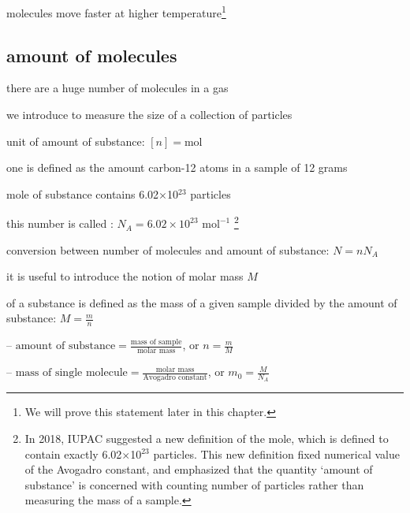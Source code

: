 molecules move faster at higher temperature\footnote{We will prove this statement later in this chapter.}


\subsection{amount of molecules}

there are a huge number of molecules in a gas

we introduce  to measure the size of a collection of particles

\cmt unit of amount of substance: $[n] = \text{mol}$

\begin{ilight}
	one  is defined as the amount carbon-12 atoms in a sample of 12 grams
\end{ilight}

 mole of substance contains 6.02$\times$10$^{23}$ particles

this number is called : $N_A = 6.02\times10^{23} \text{ mol}^{-1}$ \footnote{In 2018, IUPAC suggested a new definition of the mole, which is defined to contain exactly 6.02$\times$10$^{23}$ particles. This new definition fixed numerical value of the Avogadro constant, and emphasized that the quantity `amount of substance' is concerned with counting number of particles rather than measuring the mass of a sample.}

conversion between number of molecules and amount of substance: $\boxed{N=nN_A}$

\cmt it is useful to introduce the notion of molar mass $M$

\begin{ilight}
	 of a substance is defined as the mass of a given sample divided by the amount of substance: $M=\frac{m}{n}$
\end{ilight}

\begin{compactitem}
	\item[--] $\text{amount of substance} = \frac{\text{mass of sample}}{\text{molar mass}}$, or $n = \frac{m}{M}$
	
	\eqyskip
	
	\item[--] $\text{mass of single molecule} = \frac{\text{molar mass}}{\text{Avogadro constant}}$, or $m_0 = \frac{M}{N_A}$
\end{compactitem}

